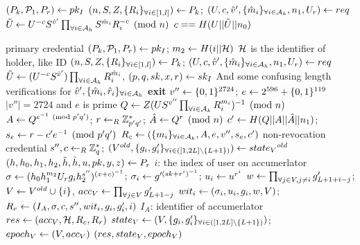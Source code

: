 \documentclass{article}
\begin{document}
\begin{algorithm}
\caption{$\verifyph$}
\label{alg:verifyreq}
\begin{algorithmic}
	\State $\pkip \la \pki $
	\State $\pkp \la \pk $; $\reqp  \la req$
	\State $\zkv{U}{}{c}{S}{v}{'}\prodi{i}{\ah}{S^{\hat{m}_{i}}R_{i}^{-c}}\pmod{n}$
	\State \Return $c == H(U||\td{U}||n_{0})$
\end{algorithmic}
\end{algorithm}

\begin{algorithm}
\caption{$\crresp$}
\label{alg:res}
\begin{algorithmic}
	\State \Comment primary credential
	\State $\pkip \la \pki $; $m_{2}\la H(i||\mch )$
	\Comment $\mch $ is the identifier of holder, like ID
	\State $\pkp \la \pk $; $\reqp  \la req$
	\State $\td{U}\la (U^{-c}S^{\hat{v}'})\prodi{i}{\ah}{R_{i}^{\hat{m}_{i}}}$, $(p, q, sk, x, r)\la \ski $
		\State \Comment And some confusing length verifications for $\hat{v}',\group{\hat{m}_{i}, \hat{r}_{i}}{i}{\ah}$ 
		\State \textbf{exit}
	\EndIf
	\State $v''\la \binbits{2724}$; $e\la 2^{596} + \binbits{119}$
	\Comment $|v''|= 2724$ and $e$ is prime
	\State $Q\la Z(US^{v''}\prodi{i}{\ak}{R_{i}^{m_{i}}})^{-1}\pmod{n}$
	\State $A\la Q^{e^{-1}\pmod{p'q'}}$; $r\lar \mbz{p'q'}$; $\hat{A}\la Q^{r}\pmod{n}$
	\State $c'\la H(Q||A||\hat{A}||n_{1})$; $s_{e}\la r -c'e^{-1}\pmod{p'q'}$
	\State $\rc \la \rcp$
	\State \Comment non-revocation credential
	\State $s'', c\lar \mbz{q}$; $(\old{V}, \stpp )\la \old{\stv }$
	\State $\prp \la \pr $
	\Comment $i$: the index of user on accumerlator
	\State $\sigma \la (h_{0}h_{1}^{m_{2}}U_{r}g_{i}h_{2}^{s''})^{(x+c)^{-1}}$; $\sigma _{i} \la g'^{(sk + r^{i})^{-1}}$; $u_{i}\la u^{r^{i}}$
	\State $w\la \prodi{j}{V, j\neq i}{\gllij }$; $V\la \old{V}\cup \set{i}$, $\accv \la \prodi{j}{V} \gllj$
	\State $\witi \la \witip $; $\rr \la \rrp $
	\State \Comment $I_{A}$: identifier of accumerlator
	\State $res \la \resp $
	\State $\stv \la \stp $; $\epv \la \epp $
	\State \Return $\crrespp $
\end{algorithmic}
\end{algorithm}
\end{document}
